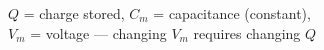 \documentclass[preview]{standalone}
\begin{document}
\begin{center}
$Q$ = charge stored, $C_m$ = capacitance (constant),\\$V_m$ = voltage --- changing $V_m$ requires changing $Q$
\end{center}
\end{document}
